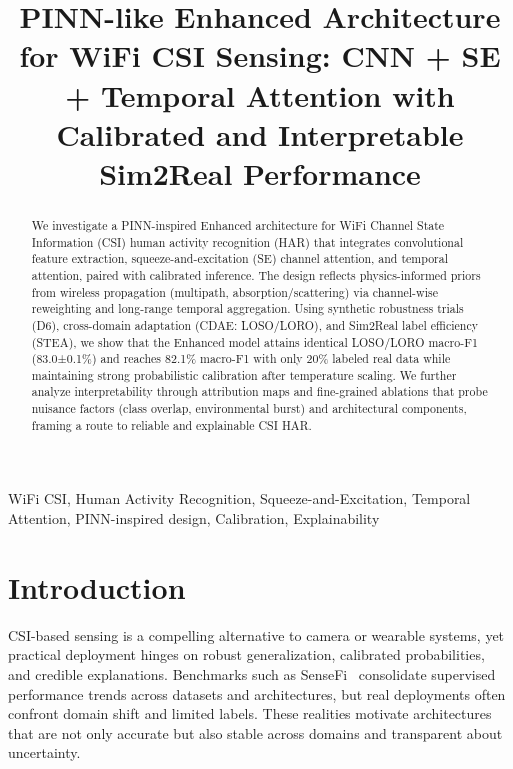 \documentclass[journal]{IEEEtran}
\begin{document}
\title{PINN-like Enhanced Architecture for WiFi CSI Sensing: CNN + SE + Temporal Attention with Calibrated and Interpretable Sim2Real Performance}

\author{
}

\maketitle

\begin{abstract}
We investigate a PINN-inspired Enhanced architecture for WiFi Channel State Information (CSI) human activity recognition (HAR) that integrates convolutional feature extraction, squeeze-and-excitation (SE) channel attention, and temporal attention, paired with calibrated inference. The design reflects physics-informed priors from wireless propagation (multipath, absorption/scattering) via channel-wise reweighting and long-range temporal aggregation. Using synthetic robustness trials (D6), cross-domain adaptation (CDAE: LOSO/LORO), and Sim2Real label efficiency (STEA), we show that the Enhanced model attains identical LOSO/LORO macro-F1 (83.0±0.1\%) and reaches 82.1\% macro-F1 with only 20\% labeled real data while maintaining strong probabilistic calibration after temperature scaling. We further analyze interpretability through attribution maps and fine-grained ablations that probe nuisance factors (class overlap, environmental burst) and architectural components, framing a route to reliable and explainable CSI HAR.
\end{abstract}

\begin{IEEEkeywords}
WiFi CSI, Human Activity Recognition, Squeeze-and-Excitation, Temporal Attention, PINN-inspired design, Calibration, Explainability
\end{IEEEkeywords}

\section{Introduction}
CSI-based sensing is a compelling alternative to camera or wearable systems, yet practical deployment hinges on robust generalization, calibrated probabilities, and credible explanations. Benchmarks such as SenseFi~\cite{yang2023sensefi} consolidate supervised performance trends across datasets and architectures, but real deployments often confront domain shift and limited labels. These realities motivate architectures that are not only accurate but also stable across domains and transparent about uncertainty.
\end{document}
